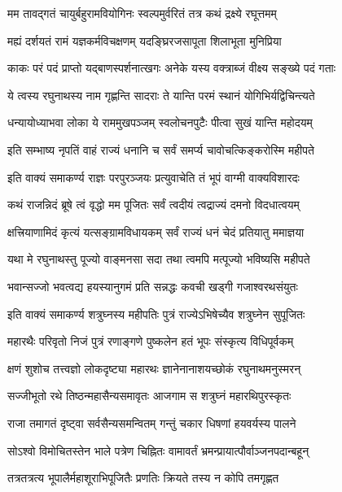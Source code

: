 \twolineshloka
{मम तावद्गतं चायुर्बहुरामवियोगिनः}
{स्वल्पमुर्वरितं तत्र कथं द्रक्ष्ये रघूत्तमम्}%

\twolineshloka
{मह्यं दर्शयतं रामं यज्ञकर्मविचक्षणम्}
{यदङ्घ्रिरजसापूता शिलाभूता मुनिप्रिया}%

\twolineshloka
{काकः परं पदं प्राप्तो यद्बाणस्पर्शनात्खगः}
{अनेके यस्य वक्त्राब्जं वीक्ष्य सङ्ख्ये पदं गताः}%

\twolineshloka
{ये त्वस्य रघुनाथस्य नाम गृह्णन्ति सादराः}
{ते यान्ति परमं स्थानं योगिभिर्यद्विचिन्त्यते}%

\twolineshloka
{धन्यायोध्याभवा लोका ये राममुखपञ्जम्}
{स्वलोचनपुटैः पीत्वा सुखं यान्ति महोदयम्}%

\twolineshloka
{इति सम्भाष्य नृपतिं वाहं राज्यं धनानि च}
{सर्वं समर्प्य चावोचत्किङ्करोस्मि महीपते}%

\twolineshloka
{इति वाक्यं समाकर्ण्य राज्ञः परपुरञ्जयः}
{प्रत्युवाचेति तं भूपं वाग्मी वाक्यविशारदः}%


\twolineshloka
{कथं राजन्निदं ब्रूषे त्वं वृद्धो मम पूजितः}
{सर्वं त्वदीयं त्वद्राज्यं दमनो विदधात्वयम्}%

\twolineshloka
{क्षत्त्रियाणामिदं कृत्यं यत्सङ्ग्रामविधायकम्}
{सर्वं राज्यं धनं चेदं प्रतियातु ममाज्ञया}%

\twolineshloka
{यथा मे रघुनाथस्तु पूज्यो वाङ्मनसा सदा}
{तथा त्वमपि मत्पूज्यो भविष्यसि महीपते}%

\twolineshloka
{भवान्सज्जो भवत्वद्य हयस्यानुगमं प्रति}
{सन्नद्धः कवची खड्गी गजाश्वरथसंयुतः}%

\twolineshloka
{इति वाक्यं समाकर्ण्य शत्रुघ्नस्य महीपतिः}
{पुत्रं राज्येऽभिषेच्यैव शत्रुघ्नेन सुपूजितः}%

\twolineshloka
{महारथैः परिवृतो निजं पुत्रं रणाङ्गणे}
{पुष्कलेन हतं भूपः संस्कृत्य विधिपूर्वकम्}%

\twolineshloka
{क्षणं शुशोच तत्त्वज्ञो लोकदृष्ट्या महारथः}
{ज्ञानेनानाशयच्छोकं रघुनाथमनुस्मरन्}%

\twolineshloka
{सज्जीभूतो रथे तिष्ठन्महासैन्यसमावृतः}
{आजगाम स शत्रुघ्नं महारथिपुरस्कृतः}%

\twolineshloka
{राजा तमागतं दृष्ट्वा सर्वसैन्यसमन्वितम्}
{गन्तुं चकार धिषणां हयवर्यस्य पालने}%

\twolineshloka
{सोऽश्वो विमोचितस्तेन भाले पत्रेण चिह्नितः}
{वामावर्तं भ्रमन्प्रायात्पौर्वाञ्जनपदान्बहून्}%

\twolineshloka
{तत्रतत्रत्य भूपालैर्महाशूराभिपूजितैः}
{प्रणतिः क्रियते तस्य न कोपि तमगृह्णत}%

